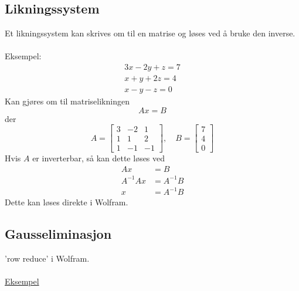 \documentclass{article}
\begin{document}
\subsection{Likningssystem}
Et likningssystem kan skrives om til en matrise og løses ved å bruke den inverse.
\\\\
Eksempel:
\begin{gather*}
    3x - 2y + z = 7 \\
    x + y + 2z = 4 \\
    x - y - z = 0
\end{gather*}
Kan gjøres om til matriselikningen
\[ Ax = B \]
der
\[ A = \begin{bmatrix}
    3 & -2 & 1 \\
    1 & 1 & 2 \\
    1 & -1 & -1
\end{bmatrix}, \quad
B = \begin{bmatrix}
    7 \\ 4 \\ 0
\end{bmatrix}\]
Hvis $A$ er inverterbar, så kan dette løses ved
\begin{align*}
    Ax &= B \\
    A^{-1}Ax &= A^{-1}B \\
    x & = A^{-1}B
\end{align*}
Dette kan løses direkte i Wolfram.

\subsection{Gausseliminasjon}
'row reduce' i Wolfram.
\\\\
\href{https://www.wolframalpha.com/input/?i=row+reduce+\%7B\%7B1\%2C+1\%2C+4\%2C+0\%7D\%2C+\%7B1\%2C+2\%2C+6\%2C+1\%7D\%2C+\%7B0\%2C+3\%2C+6\%2C+3\%7D\%7D}{Eksempel}
\end{document}
